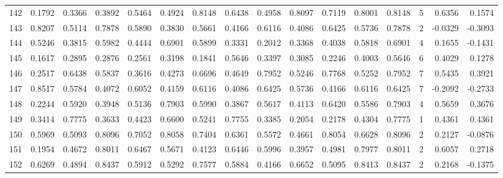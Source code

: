 \begin{tabular}{lrrrrrrrrrrrrrrr}
142 &      0.1792 &  0.3366 &  0.3892 &  0.5464 &  0.4924 &  0.8148 &  0.6438 &  0.4958 &  0.8097 &  0.7119 &   0.8001 &     0.8148 &      5 &                    0.6356 &                     0.1574 \\
143 &      0.8207 &  0.5114 &  0.7878 &  0.5890 &  0.3830 &  0.5661 &  0.4166 &  0.6116 &  0.4086 &  0.6425 &   0.5736 &     0.7878 &      2 &                   -0.0329 &                    -0.3093 \\
144 &      0.5246 &  0.3815 &  0.5982 &  0.4444 &  0.6901 &  0.5899 &  0.3331 &  0.2012 &  0.3368 &  0.4038 &   0.5818 &     0.6901 &      4 &                    0.1655 &                    -0.1431 \\
145 &      0.1617 &  0.2895 &  0.2876 &  0.2561 &  0.3198 &  0.1841 &  0.5646 &  0.3397 &  0.3085 &  0.2246 &   0.4003 &     0.5646 &      6 &                    0.4029 &                     0.1278 \\
146 &      0.2517 &  0.6438 &  0.5837 &  0.3616 &  0.4273 &  0.6696 &  0.4649 &  0.7952 &  0.5246 &  0.7768 &   0.5252 &     0.7952 &      7 &                    0.5435 &                     0.3921 \\
147 &      0.8517 &  0.5784 &  0.4072 &  0.6052 &  0.4159 &  0.6116 &  0.4086 &  0.6425 &  0.5736 &  0.4166 &   0.6116 &     0.6425 &      7 &                   -0.2092 &                    -0.2733 \\
148 &      0.2244 &  0.5920 &  0.3948 &  0.5136 &  0.7903 &  0.5990 &  0.3867 &  0.5617 &  0.4113 &  0.6420 &   0.5586 &     0.7903 &      4 &                    0.5659 &                     0.3676 \\
149 &      0.3414 &  0.7775 &  0.3633 &  0.4423 &  0.6600 &  0.5241 &  0.7755 &  0.3385 &  0.2054 &  0.2178 &   0.4304 &     0.7775 &      1 &                    0.4361 &                     0.4361 \\
150 &      0.5969 &  0.5093 &  0.8096 &  0.7052 &  0.8058 &  0.7404 &  0.6361 &  0.5572 &  0.4661 &  0.8054 &   0.6628 &     0.8096 &      2 &                    0.2127 &                    -0.0876 \\
151 &      0.1954 &  0.4672 &  0.8011 &  0.6467 &  0.5671 &  0.4123 &  0.6446 &  0.5996 &  0.3957 &  0.4981 &   0.7977 &     0.8011 &      2 &                    0.6057 &                     0.2718 \\
152 &      0.6269 &  0.4894 &  0.8437 &  0.5912 &  0.5292 &  0.7577 &  0.5884 &  0.4166 &  0.6652 &  0.5095 &   0.8413 &     0.8437 &      2 &                    0.2168 &                    -0.1375 \\

\end{tabular}
